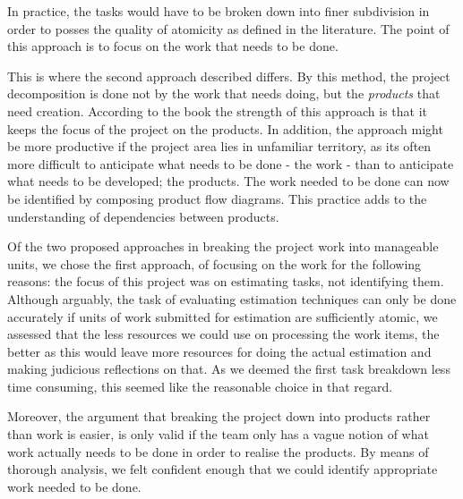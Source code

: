 In practice, the tasks would have to be broken down into finer subdivision in order to posses the quality of atomicity as defined in the literature. The point of this approach is to focus on the work that needs to be done.

This is where the second approach described differs. By this method, the project decomposition is done not by the work that needs doing, but the \textit{products}  that need creation. According to the book the strength of this approach is that it keeps the focus of the project on the products. In addition, the approach might be more productive if the project area lies in unfamiliar territory, as its often more difficult to anticipate what needs to be done - the work - than to anticipate what needs to be developed; the products. The work needed to be done can now be identified by composing product flow diagrams. This practice adds to the understanding of dependencies between products.

Of the two proposed approaches in breaking the project work into manageable units, we chose the first approach, of focusing on the work for the following reasons: the focus of this project was on estimating tasks, not identifying them. Although arguably, the task of evaluating estimation techniques can only be done accurately if units of work submitted for estimation are sufficiently atomic, we assessed that the less resources we could use on processing the work items, the better as this would leave more resources for doing the actual estimation and making judicious reflections on that. As we deemed the first task breakdown less time consuming, this seemed like the reasonable choice in that regard.

Moreover, the argument that breaking the project down into products rather than work is easier, is only valid if the team only has a vague notion of what work actually needs to be done in order to realise the products. By means of thorough analysis, we felt confident enough that we could identify appropriate work needed to be done.

